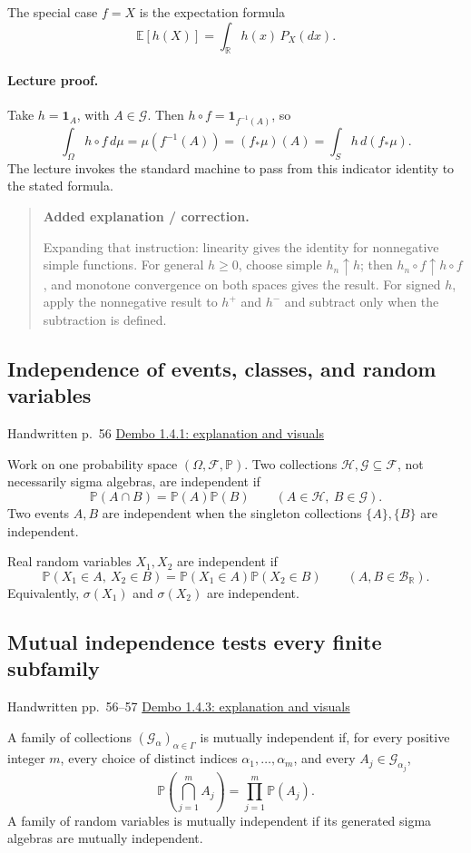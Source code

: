 \documentclass[11pt,letterpaper]{article}
\newcommand{\lecturesection}[1]{\subsection{#1}}
\begin{document}
The special case $f=X$ is the expectation formula \[\mathbb E[h(X)]=\int_{\mathbb R}h(x)\,P_X(dx).\]

\paragraph{Lecture proof.}
Take $h=\mathbf{1}_A$, with $A\in\mathcal G$. Then $h\circ f=\mathbf{1}_{f^{-1}(A)}$, so \[\int_\Omega h\circ f\,d\mu=\mu(f^{-1}(A))=(f_*\mu)(A)=\int_S h\,d(f_*\mu).\] The lecture invokes the standard machine to pass from this indicator identity to the stated formula.

\begin{quote}\small\textbf{Added explanation / correction.}

Expanding that instruction: linearity gives the identity for nonnegative simple functions. For general $h\ge0$, choose simple $h_n\uparrow h$; then $h_n\circ f\uparrow h\circ f$, and monotone convergence on both spaces gives the result. For signed $h$, apply the nonnegative result to $h^+$ and $h^-$ and subtract only when the subtraction is defined.
\end{quote}

\hypertarget{l7-s2}{}
\lecturesection{Independence of events, classes, and random variables}
{\small\textcolor{lectureink}{Handwritten p.\ 56} \quad \href{https://josephrbailey.com/probability/\#entry-1-4-1}{Dembo 1.4.1: explanation and visuals}}

Work on one probability space $(\Omega,\mathcal F,\mathbb P)$. Two collections $\mathcal H,\mathcal G\subseteq\mathcal F$, not necessarily sigma algebras, are independent if \[\mathbb P(A\cap B)=\mathbb P(A)\mathbb P(B)\qquad(A\in\mathcal H,\ B\in\mathcal G).\] Two events $A,B$ are independent when the singleton collections $\{A\},\{B\}$ are independent.

Real random variables $X_1,X_2$ are independent if \[\mathbb P(X_1\in A,\ X_2\in B)=\mathbb P(X_1\in A)\mathbb P(X_2\in B)\qquad(A,B\in\mathcal B_{\mathbb R}).\] Equivalently, $\sigma(X_1)$ and $\sigma(X_2)$ are independent.

\hypertarget{l7-s3}{}
\lecturesection{Mutual independence tests every finite subfamily}
{\small\textcolor{lectureink}{Handwritten pp.\ 56--57} \quad \href{https://josephrbailey.com/probability/\#entry-1-4-3}{Dembo 1.4.3: explanation and visuals}}

A family of collections $(\mathcal G_\alpha)_{\alpha\in\Gamma}$ is mutually independent if, for every positive integer $m$, every choice of distinct indices $\alpha_1,\ldots,\alpha_m$, and every $A_j\in\mathcal G_{\alpha_j}$, \[\mathbb P\left(\bigcap_{j=1}^m A_j\right)=\prod_{j=1}^m\mathbb P(A_j).\] A family of random variables is mutually independent if its generated sigma algebras are mutually independent.
\end{document}
